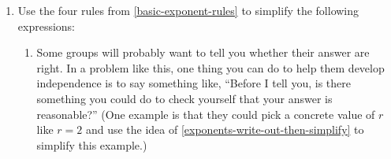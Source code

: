\documentclass{article}
\begin{document}
\begin{enumerate}
\begin{workshop}
    If students ask about what happens when $a, b < 0$, you can let them know that the rules below are still true if the exponents $m, n$ are integers. 
  \end{workshop}

  Generalize what you figured out in
  \ref{exponents-write-out-then-simplify}: If $a, b > 0$, then:

  \begin{itemize}
  \item $(ab)^n = $
  \begin{solution}
      $=a^nb^n$
  \end{solution}
  \item $a^m a^n = $
    \begin{solution}
        $=a^{m+n}$
    \end{solution}
  \item $\dfrac{a^m}{a^n} = $
    \begin{solution}
        $a^{m-n}$
    \end{solution}
  \item $(a^m)^n = $
    \begin{solution}
        $=a^{mn}$
    \end{solution}
  \end{itemize}

  \begin{problem}[\vfill]
    These four rules are the main ones to remember. If you forget them, what can you do to come up with them again?
  \end{problem}

  \begin{problem}[\vfill\newpage]
    You might wonder whether there's a rule for $a^m + a^n$. Do a concrete example (that is, pick concrete values of $a, m, n$) to convince yourself there isn't.

    \emph{Note:} Not every example will be convincing, so if your first attempt isn't convincing, try another!
  \end{problem}

\item 

  Use the four rules from \ref{basic-exponent-rules} to simplify the following expressions:

  \begin{enumerate}

  \item

    \begin{workshop}      
      Some groups will probably want to tell you whether their answer are right. In a problem like this, one thing you can do to help them develop independence is to say something like, ``Before I tell you, is there something you could do to check yourself that your answer is reasonable?'' (One example is that they could pick a concrete value of $r$ like $r = 2$ and use the idea of \ref{exponents-write-out-then-simplify} to simplify this example.) 
    \end{workshop}


\end{enumerate}
\end{enumerate}
\end{document}
